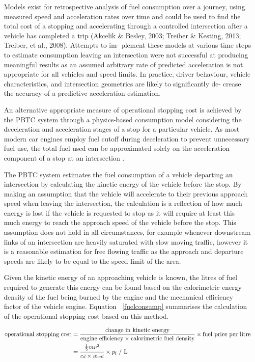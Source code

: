 Models exist for retrospective analysis of fuel consumption over a journey, using measured speed and acceleration rates over time and could be used to find the total cost of a stopping and accelerating through a controlled intersection after a vehicle has completed a trip (Akcelik & Besley, 2003; Treiber & Kesting, 2013; Treiber, et al., 2008). Attempts to im- plement these models at various time steps to estimate consumption leaving an intersection were not successful at producing meaningful results as an assumed arbitrary rate of predicted acceleration is not appropriate for all vehicles and speed limits. In practice, driver behaviour, vehicle characteristics, and intersection geometrics are likely to significantly de- crease the accuracy of a predictive acceleration estimation.

An alternative appropriate measure of operational stopping cost is achieved by the PBTC system through a physics-based consumption model considering the deceleration and acceleration stages of a stop for a particular vehicle. As most modern car engines employ fuel cutoff during deceleration to prevent unnecessary fuel use, the total fuel used can be approximated solely on the acceleration component of a stop at an intersection \cite{kesting2013traffic}. 

The PBTC system estimates the fuel consumption of a vehicle departing an intersection by calculating the kinetic energy of the vehicle before the stop. By making an assumption that the vehicle will accelerate to their previous approach speed when leaving the intersection, the calculation is a reflection of how much energy is lost if the vehicle is requested to stop as it will require at least this much energy to reach the approach speed of the vehicle before the stop. This assumption does not hold in all circumstances, for example whenever downstream links of an intersection are heavily saturated with slow moving traffic, however it is a reasonable estimation for free flowing traffic as the approach and departure speeds are likely to be equal to the speed limit of the area. 

Given the kinetic energy of an approaching vehicle is known, the litres of fuel required to generate this energy can be found based on the calorimetric energy density of the fuel being burned by the engine and the mechanical efficiency factor of the vehicle engine. Equation ~\ref{fuelconsump} summarises the calculation of the operational stopping cost based on this method.

\begin{align}
	\centering
		\text{operational stopping cost} &= {{\text{change in kinetic energy} \over {\text{engine efficiency} \times \text{calorimetric fuel density}}}} \times \text {fuel price per litre} \\ 
		& = {\frac{\frac{1}{2}m{v}^{2} }{c\substack{d} \times w\substack{cal}}} \times {p_\text{f} \text { / L}}
	\label{fuelconsump}
\end{align}

